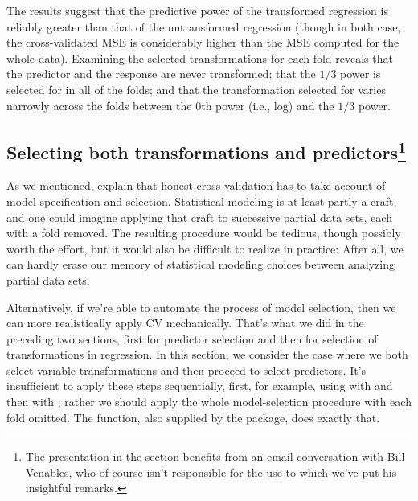 \documentclass[
]{jss}
\begin{document}
The results suggest that the predictive power of the transformed
regression is reliably greater than that of the untransformed regression
(though in both case, the cross-validated MSE is considerably higher
than the MSE computed for the whole data). Examining the selected
transformations for each fold reveals that the predictor
 and the response  are never transformed;
that the \(1/3\) power is selected for  in all of the
folds; and that the transformation selected for  varies
narrowly across the folds between the \(0\)th power (i.e., log) and the
\(1/3\) power.

\hypertarget{selecting-both-transformations-and-predictorsvenables}{%
\subsection[Selecting both transformations and
predictors]{\texorpdfstring{Selecting both transformations and
predictors\footnote{The presentation in the section benefits from an
  email conversation with Bill Venables, who of course isn't responsible
  for the use to which we've put his insightful remarks.}}{Selecting both transformations and predictors}}\label{selecting-both-transformations-and-predictorsvenables}}

As we mentioned, \citet[Sec. 7.10.2: ``The Wrong and Right Way to Do
Cross-validation'']{HastieTibshiraniFriedman:2009} explain that honest
cross-validation has to take account of model specification and
selection. Statistical modeling is at least partly a craft, and one
could imagine applying that craft to successive partial data sets, each
with a fold removed. The resulting procedure would be tedious, though
possibly worth the effort, but it would also be difficult to realize in
practice: After all, we can hardly erase our memory of statistical
modeling choices between analyzing partial data sets.

Alternatively, if we're able to automate the process of model selection,
then we can more realistically apply CV mechanically. That's what we did
in the preceding two sections, first for predictor selection and then
for selection of transformations in regression. In this section, we
consider the case where we both select variable transformations and then
proceed to select predictors. It's insufficient to apply these steps
sequentially, first, for example, using  with
 and then with ; rather we
should apply the whole model-selection procedure with each fold omitted.
The  function, also supplied by the
 package, does exactly that.
\end{document}
